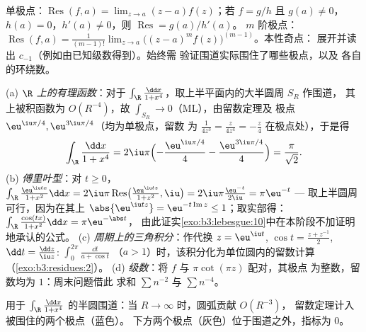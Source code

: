\begin{method}[留数的计算]\label{met:b3:residues:compute}
单极点：$\operatorname{Res}(f, a) = \lim_{z\to a}(z -
a)f(z)$；若 $f = g/h$ 且 $g(a) \neq 0$，$h(a) = 0$，$h'(a)
\neq 0$，则 $\operatorname{Res} = g(a)/h'(a)$。
$m$ 阶极点：$\operatorname{Res}(f, a) = \frac1{(m-1)!}\lim_{z\to
a}\bigl((z-a)^mf(z)\bigr)^{(m-1)}$。本性奇点：
展开并读出 $c_{-1}$（例如由已知级数得到）。始终需
验证围道实际围住了哪些极点，以及
各自的环绕数。
\end{method}

\begin{example}[四类经典积分]
\label{ex:b3:residues:integrals}
(a) \emph{$\R$ 上的有理函数}：对于 $\int_\R\frac{\dd x}{1 +
x^4}$，取上半平面内的大半圆周 $S_R$ 作围道，
其上被积函数为 $O(R^{-4})$，故
$\int_{S_R} \to 0$（ML），由留数定理及
极点 $\eu^{\iu\pi/4}, \eu^{3\iu\pi/4}$（均为单极点，留数
为 $\frac1{4z^3} = \frac{z}{4z^4} = -\frac z4$ 在极点处），于是得
\[
\int_\R\frac{\dd x}{1 + x^4}
= 2\iu\pi\Bigl(-\frac{\eu^{\iu\pi/4}}4 -
\frac{\eu^{3\iu\pi/4}}4\Bigr)
= \frac{\pi}{\sqrt2} .
\]
(b) \emph{傅里叶型}：对 $t \geq 0$，
$\int_\R\frac{\eu^{\iu tx}}{1 + x^2}\dd x =
2\iu\pi\operatorname{Res}\bigl(\tfrac{\eu^{\iu tz}}{1+z^2},
\iu\bigr) = 2\iu\pi\frac{\eu^{-t}}{2\iu} = \pi\eu^{-t}$ ---
取上半圆周可行，因为在其上 $\abs{\eu^{\iu tz}} =
\eu^{-t\operatorname{Im}z} \leq 1$；取实部得：
$\int_\R\frac{\cos(tx)}{1+x^2}\dd x = \pi\eu^{-\abs t}$，
由此证实\cref{exo:b3:lebesgue:10}中在本阶段不加证明地承认的公式。
(c) \emph{周期上的三角积分}：作代换 $z =
\eu^{\iu t}$, $\cos t = \frac{z + z^{-1}}2$, $\dd t =
\frac{\dd z}{\iu z}$: $\int_0^{2\pi}\frac{\dd t}{a + \cos t}$
（$a > 1$）时，该积分化为单位圆内的留数计算
（\cref{exo:b3:residues:2}）。
(d) \emph{级数}：将 $f$ 与 $\pi\cot(\pi z)$ 配对，其极点
为整数，留数均为 $1$：周末问题借此
求和 $\sum n^{-2}$ 与 $\sum n^{-4}$。
\end{example}

\begin{omfigure}

{\small 用于 $\int_\R\frac{\dd x}{1 +
x^4}$ 的半圆围道：当 $R \to \infty$ 时，圆弧贡献 $O(R^{-3})$，
留数定理计入被围住的两个极点（蓝色）。
下方两个极点（灰色）位于围道之外，指标为 $0$。}
\end{omfigure}


